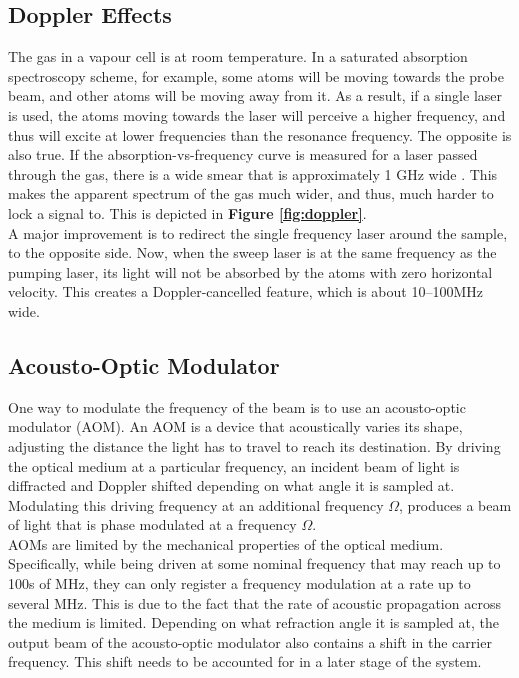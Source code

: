 \subsection{Doppler Effects}

The gas in a vapour cell is at room temperature. In a saturated absorption spectroscopy scheme, for example, some atoms will be moving towards the probe beam, and other atoms will be moving away from it. As a result, if a single laser is used, the atoms moving towards the laser will perceive a higher frequency, and thus will excite at lower frequencies than the resonance frequency.  The opposite is also true.  If the absorption-vs-frequency curve is measured for a laser passed through the gas, there is a wide smear that is approximately 1 GHz wide \cite{madison14}.  This makes the apparent spectrum of the gas much wider, and thus, much harder to lock a signal to. This is depicted in \textbf{Figure \ref{fig:doppler}}. \\

A major improvement is to redirect the single frequency laser around the sample, to the opposite side.  Now, when the sweep laser is at the same frequency as the pumping laser, its light will not be absorbed by the atoms with zero horizontal velocity.  This creates a Doppler-cancelled feature, which is about 10--100MHz wide.

\subsection{Acousto-Optic Modulator}

One way to modulate the frequency of the beam is to use an acousto-optic modulator (AOM). An AOM is a device that acoustically varies its shape, adjusting the distance the light has to travel to reach its destination.  By driving the optical medium at a particular frequency, an incident beam of light is diffracted and Doppler shifted depending on what angle it is sampled at. Modulating this driving frequency at an additional frequency $\Omega$, produces a beam of light that is phase modulated at a frequency $\Omega$. \\

AOMs are limited by the mechanical properties of the optical medium. Specifically, while being driven at some nominal frequency that may reach up to 100s of MHz, they can only register a frequency modulation at a rate up to several MHz. This is due to the fact that the rate of acoustic propagation across the medium is limited. Depending on what refraction angle it is sampled at, the output beam of the acousto-optic modulator also contains a shift in the carrier frequency.  This shift needs to be accounted for in a later stage of the system.

